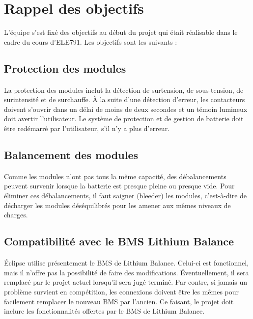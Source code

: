 \section{Rappel des objectifs}

	\paragraph{}
	L’équipe s’est fixé des objectifs au début du projet qui était réalisable dans le cadre du cours d’ELE791. Les objectifs sont les suivants :

	\subsection{Protection des modules}
	
		\paragraph{}
		La protection des modules inclut la détection de surtension, de sous-tension, de surintensité et de surchauffe. À la suite d’une détection d’erreur, les contacteurs doivent s’ouvrir dans un délai de moins de deux secondes et un témoin lumineux doit avertir l’utilisateur. Le système de protection et de gestion de batterie doit être redémarré par l’utilisateur, s’il n’y a plus d’erreur.

	\subsection{Balancement des modules}

		\paragraph{}
		Comme les modules n’ont pas tous la même capacité, des débalancements peuvent survenir lorsque la batterie est presque pleine ou presque vide. Pour éliminer ces débalancements, il faut saigner (bleeder) les modules, c’est-à-dire de décharger les modules déséquilibrés pour les amener aux mêmes niveaux de charges.
		
	\subsection{Compatibilité avec le BMS Lithium Balance}

		\paragraph{}
		Éclipse utilise présentement le BMS de Lithium Balance. Celui-ci est fonctionnel, mais il n’offre pas la possibilité de faire des modifications. Éventuellement, il sera remplacé par le projet actuel lorsqu'il sera jugé terminé. Par contre, si jamais un problème survient en compétition, les connexions doivent être les mêmes pour facilement remplacer le nouveau BMS par l’ancien. Ce faisant, le projet doit inclure les fonctionnalités offertes par le BMS de Lithium Balance.

